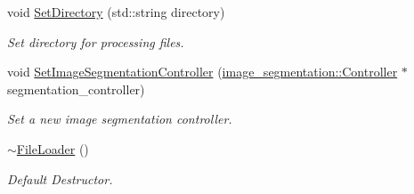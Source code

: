 \begin{DoxyCompactItemize}
\mbox{\label{classimage__acquisition_1_1_file_loader_ac72a226fed2942ec6052d912ad2fe257}} 
void \mbox{\hyperlink{classimage__acquisition_1_1_file_loader_ac72a226fed2942ec6052d912ad2fe257}{Set\+Directory}} (std\+::string directory)
\begin{DoxyCompactList}\small\item\em Set directory for processing files. \end{DoxyCompactList}\item 
\mbox{\label{classimage__acquisition_1_1_file_loader_ac93935284d32d03d9acff9b567f53180}} 
void \mbox{\hyperlink{classimage__acquisition_1_1_file_loader_ac93935284d32d03d9acff9b567f53180}{Set\+Image\+Segmentation\+Controller}} (\mbox{\hyperlink{classimage__segmentation_1_1_controller}{image\+\_\+segmentation\+::\+Controller}} $\ast$segmentation\+\_\+controller)
\begin{DoxyCompactList}\small\item\em Set a new image segmentation controller. \end{DoxyCompactList}\item 
\mbox{\label{classimage__acquisition_1_1_file_loader_ad33ba7e58a9c22173c88213be6cd6e42}} 
\mbox{\hyperlink{classimage__acquisition_1_1_file_loader_ad33ba7e58a9c22173c88213be6cd6e42}{$\sim$\+File\+Loader}} ()
\begin{DoxyCompactList}\small\item\em Default Destructor. \end{DoxyCompactList}\end{DoxyCompactItemize}
